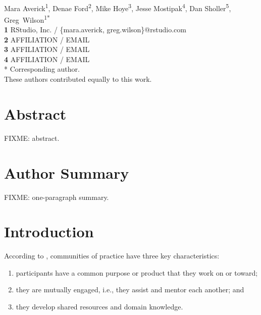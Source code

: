 \documentclass[10pt,letterpaper]{article}
\begin{document}
\vspace*{0.2in}

\begin{flushleft}
{\Large
\textbf{}
}
\newline
\\
{Mara Averick}\textsuperscript{1{\ddag}},
{Denae Ford}\textsuperscript{2{\ddag}},
{Mike Hoye}\textsuperscript{3{\ddag}},
{Jesse Mostipak}\textsuperscript{4{\ddag}},
{Dan Sholler}\textsuperscript{5{\ddag}},
{Greg~Wilson}\textsuperscript{1{\ddag}*}
\\
\bigskip
\textbf{1} RStudio, Inc. / \{mara.averick, greg.wilson\}@rstudio.com \\
\textbf{2} AFFILIATION / EMAIL \\
\textbf{3} AFFILIATION / EMAIL \\
\textbf{4} AFFILIATION / EMAIL \\
\bigskip
* Corresponding author. \\
\bigskip
{\ddag} These authors contributed equally to this work.
\end{flushleft}

\section*{Abstract}

FIXME: abstract.

\section*{Author Summary}

FIXME: one-paragraph summary.

\section*{Introduction}

According to \cite{wenger1999}, communities of practice have three key characteristics:

\begin{enumerate}

\item participants have a common purpose or product that they work on or toward;

\item they are mutually engaged, i.e., they assist and mentor each another; and

\item they develop shared resources and domain knowledge.

\end{enumerate}
\end{document}
